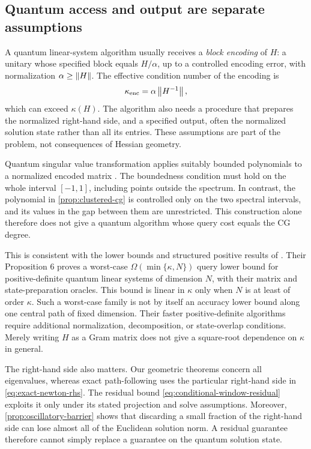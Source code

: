\subsection{Quantum access and output are separate assumptions}

A quantum linear-system algorithm usually receives a
\emph{block encoding} of $H$: a unitary whose specified block equals
$H/\alpha$, up to a controlled encoding error, with normalization
$\alpha\geq\left\lVert H\right\rVert$. The effective condition
number of the encoding is
\begin{equation}
 \kappa_{\mathrm{enc}}=\alpha\left\lVert H^{-1}\right\rVert,
 \label{eq:encoding-condition}
\end{equation}
which can exceed $\kappa(H)$. The algorithm also needs a procedure
that prepares the normalized right-hand side, and a specified output,
often the normalized solution state rather than all its entries. These
assumptions are part of the problem, not consequences of Hessian
geometry.

Quantum singular value transformation applies suitably bounded
polynomials to a normalized encoded matrix \citep{gilyen2019}. The
boundedness condition must hold on the whole interval $[-1,1]$,
including points outside the spectrum. In contrast, the polynomial in
\cref{prop:clustered-cg} is controlled only on the two spectral
intervals, and its values in the gap between them are unrestricted.
This construction alone therefore does not give a quantum algorithm
whose query cost equals the CG degree.

This is consistent with the lower bounds and structured positive
results of \citet{orsucci2021}. Their
Proposition 6 proves a worst-case $\Omega(\min\{\kappa,N\})$
query lower bound for positive-definite quantum linear systems of
dimension $N$, with their matrix and state-preparation oracles. This
bound is linear in $\kappa$ only when $N$ is at least of order
$\kappa$. Such a worst-case family is not by itself an accuracy lower
bound along one central path of fixed dimension. Their faster
positive-definite algorithms require additional normalization, decomposition, or state-overlap
conditions. Merely writing $H$ as a Gram matrix does not give a
square-root dependence on $\kappa$ in general.

The right-hand side also matters. Our geometric theorems concern all
eigenvalues, whereas exact path-following uses the particular
right-hand side in \eqref{eq:exact-newton-rhs}. The residual bound
\eqref{eq:conditional-window-residual} exploits it only under its
stated projection and solve assumptions. Moreover,
\cref{prop:oscillatory-barrier} shows that discarding a small fraction
of the right-hand side can lose almost all of the Euclidean solution
norm. A residual guarantee therefore cannot simply replace a guarantee
on the quantum solution state.

